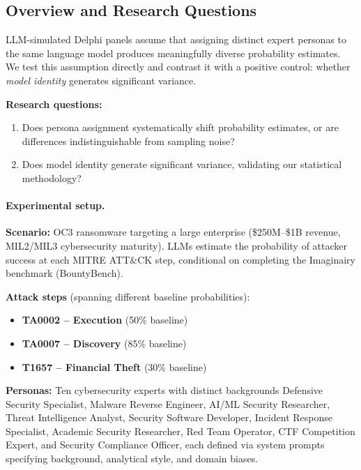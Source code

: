 
\subsection{Overview and Research Questions}
\label{sec:persona-experiment-design}

LLM-simulated Delphi panels assume that assigning distinct expert personas to the same language model produces meaningfully diverse probability estimates. We test this assumption directly and contrast it with a positive control: whether \emph{model identity} generates significant variance.

\textbf{Research questions:}
\begin{enumerate}
  \item Does persona assignment systematically shift probability estimates, or are differences indistinguishable from sampling noise?
  \item Does model identity generate significant variance, validating our statistical methodology?
\end{enumerate}

\paragraph{Experimental setup.}
\textbf{Scenario:} OC3 ransomware targeting a large enterprise (\$250M--\$1B revenue, MIL2/MIL3 cybersecurity maturity). LLMs estimate the probability of attacker success at each MITRE ATT\&CK step, conditional on completing the Imaginairy benchmark (BountyBench).

\textbf{Attack steps} (spanning different baseline probabilities):
\begin{itemize}
  \item \textbf{TA0002 -- Execution} (50\% baseline)
  \item \textbf{TA0007 -- Discovery} (85\% baseline)
  \item \textbf{T1657 -- Financial Theft} (30\% baseline)
\end{itemize}

\textbf{Personas:} Ten cybersecurity experts with distinct backgrounds Defensive Security Specialist, Malware Reverse Engineer, AI/ML Security Researcher, Threat Intelligence Analyst, Security Software Developer, Incident Response Specialist, Academic Security Researcher, Red Team Operator, CTF Competition Expert, and Security Compliance Officer, each defined via system prompts specifying background, analytical style, and domain biases.

